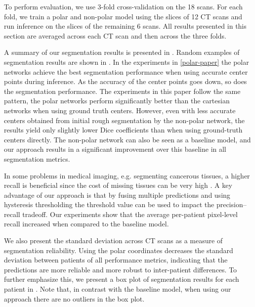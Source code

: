 To perform evaluation, we use 3-fold cross-validation on the 18 scans. For each fold, we train a polar and non-polar model using the slices of 12 CT scans and run inference on the slices of the remaining 6 scans. All results presented in this section are averaged across each CT scan and then across the three folds.

A summary of our segmentation results is presented in . Random examples of segmentation results are shown in . In the experiments in \ref{polar-paper} the polar networks achieve the best segmentation performance when using accurate center points during inference. As the accuracy of the center points goes down, so does the segmentation performance. The experiments in this paper follow the same pattern, the polar networks perform significantly better than the cartesian networks when using ground truth centers. However, even with less accurate centers obtained from initial rough segmentation by the non-polar network, the results yield only slightly lower Dice coefficients than when using ground-truth centers directly. The non-polar network can also be seen as a baseline model, and our approach results in a significant improvement over this baseline in all segmentation metrics.

In some problems in medical imaging, e.g. segmenting cancerous tissues, a higher recall is beneficial since the cost of missing tissues can be very high \cite{tahaMetricsEvaluating3D2015}. A key advantage of our approach is that by fusing multiple predictions and using hysteresis thresholding the threshold value can be used to impact the precision--recall tradeoff. Our experiments show that the average per-patient pixel-level recall increased when compared to the baseline model.

We also present the standard deviation across CT scans as a measure of segmentation reliability. Using the polar coordinates decreases the standard deviation between patients of all performance metrics, indicating that the predictions are more reliable and more robust to inter-patient differences. To further emphasize this, we present a box plot of segmentation results for each patient in . Note that, in contrast with the baseline model, when using our approach there are no outliers in the box plot.

